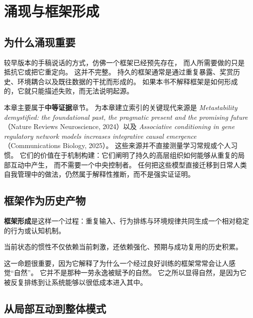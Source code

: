 \chapter{涌现与框架形成}
\label{ch:emergence}

\section{为什么涌现重要}

较早版本的手稿说话的方式，仿佛一个框架已经预先存在，
而人所需要做的只是抵抗它或把它重定向。
这并不完整。
持久的框架通常是通过重复暴露、奖赏历史、环境耦合以及既往数据的干扰而形成的。
如果本书不解释框架是如何形成的，它就只能描述失败，而无法说明起源。

本章主要属于\textbf{中等证据}章节。
为本章建立索引的关键现代来源是
\emph{Metastability demystified: the foundational past, the pragmatic present and the promising future}
（Nature Reviews Neuroscience, 2024）以及
\emph{Associative conditioning in gene regulatory network models increases integrative causal emergence}
（Communications Biology, 2025）。
这些来源并不直接测量学习常规或个人习惯。
它们的价值在于机制构建：它们阐明了持久的高层组织如何能够从重复的局部互动中产生，
而不需要一个中央控制者。
任何把这些模型直接迁移到日常人类自我管理中的做法，仍然属于解释性推断，而不是强实证证明。

\section{框架作为历史产物}

\begin{definition}[框架形成]
\textbf{框架形成}是这样一个过程：重复输入、行为排练与环境规律共同生成一个相对稳定的行为或认知机制。
\end{definition}

\begin{proposition}[历史敏感的惯性]
当前状态的惯性不仅依赖当前刺激，还依赖强化、预期与成功复用的历史积累。
\end{proposition}

\begin{discussion}
这一命题很重要，因为它解释了为什么一个经过良好训练的框架常常会让人感觉“自然”。
它并不是那种一劳永逸被赋予的自然。
它之所以显得自然，是因为它被反复排练到让系统能够以很低成本进入其中。
\end{discussion}

\section{从局部互动到整体模式}

